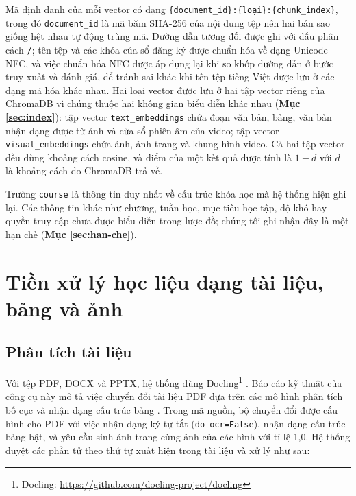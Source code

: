 \bigbreak\noindent
Mã định danh của mỗi vector có dạng \texttt{\{document\_id\}:\{loại\}:\{chunk\_index\}}, trong đó \texttt{document\_id} là mã băm SHA-256 của nội dung tệp nên hai bản sao giống hệt nhau tự động trùng mã. Đường dẫn tương đối được ghi với dấu phân cách \texttt{/}; tên tệp và các khóa của sổ đăng ký được chuẩn hóa về dạng Unicode NFC, và việc chuẩn hóa NFC được áp dụng lại khi so khớp đường dẫn ở bước truy xuất và đánh giá, để tránh sai khác khi tên tệp tiếng Việt được lưu ở các dạng mã hóa khác nhau. Hai loại vector được lưu ở hai tập vector riêng của ChromaDB vì chúng thuộc hai không gian biểu diễn khác nhau (\textbf{Mục \ref{sec:index}}): tập vector \texttt{text\_embeddings} chứa đoạn văn bản, bảng, văn bản nhận dạng được từ ảnh và cửa sổ phiên âm của video; tập vector \texttt{visual\_embeddings} chứa ảnh, ảnh trang và khung hình video. Cả hai tập vector đều dùng khoảng cách cosine, và điểm của một kết quả được tính là $1 - d$ với $d$ là khoảng cách do ChromaDB trả về.

\bigbreak\noindent
Trường \texttt{course} là thông tin duy nhất về cấu trúc khóa học mà hệ thống hiện ghi lại. Các thông tin khác như chương, tuần học, mục tiêu học tập, độ khó hay quyền truy cập chưa được biểu diễn trong lược đồ; chúng tôi ghi nhận đây là một hạn chế (\textbf{Mục \ref{sec:han-che}}).


\section{Tiền xử lý học liệu dạng tài liệu, bảng và ảnh}\label{sec:tien-xu-ly-tai-lieu}

\subsection{Phân tích tài liệu}

Với tệp PDF, DOCX và PPTX, hệ thống dùng Docling\footnote{Docling: \url{https://github.com/docling-project/docling}} \cite{auer2024docling}. Báo cáo kỹ thuật của công cụ này mô tả việc chuyển đổi tài liệu PDF dựa trên các mô hình phân tích bố cục và nhận dạng cấu trúc bảng \cite{auer2024docling}. Trong mã nguồn, bộ chuyển đổi được cấu hình cho PDF với việc nhận dạng ký tự tắt (\texttt{do\_ocr=False}), nhận dạng cấu trúc bảng bật, và yêu cầu sinh ảnh trang cùng ảnh của các hình với tỉ lệ 1,0. Hệ thống duyệt các phần tử theo thứ tự xuất hiện trong tài liệu và xử lý như sau:

